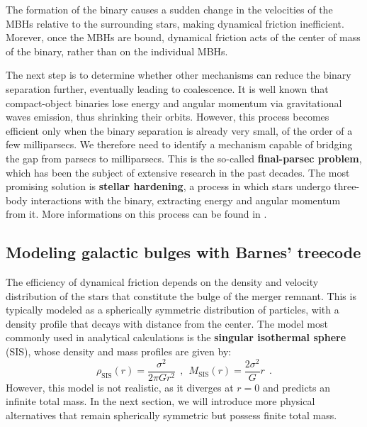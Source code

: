 \documentclass[fleqn,usenatbib]{mnras}
\begin{document}
The formation of the binary causes a sudden change in the velocities of the MBHs relative to the surrounding stars, making dynamical friction inefficient.
Morever, once the MBHs are bound, dynamical friction acts of the center of mass of the binary, rather than on the individual MBHs.

The next step is to determine whether other mechanisms can reduce the binary separation further, eventually leading to coalescence.
It is well known that compact-object binaries lose energy and angular momentum via gravitational waves emission, thus shrinking their orbits.
However, this process becomes efficient only when the binary separation is already very small, of the order of a few milliparsecs.
We therefore need to identify a mechanism capable of bridging the gap from parsecs to milliparsecs.
This is the so-called \textbf{final-parsec problem}, which has been the subject of extensive research in the past decades.
The most promising solution is \textbf{stellar hardening}, a process in which stars undergo three-body interactions with the binary, extracting energy and angular momentum from it.
More informations on this process can be found in \cite{Quinlan1996}.

\subsection{Modeling galactic bulges with Barnes' treecode}\label{sec:introduction_models}
The efficiency of dynamical friction depends on the density and velocity distribution of the stars that constitute the bulge of the merger remnant.
This is typically modeled as a spherically symmetric distribution of particles, with a density profile that decays with distance from the center.
The model most commonly used in analytical calculations is the \textbf{singular isothermal sphere} (SIS), whose density and mass profiles are given by:
\begin{equation}
    \rho_\text{SIS}(r) = \dfrac{\sigma^2}{2 \pi G r^2} \:\: , \:\: M_\text{SIS}(r) = \dfrac{2 \sigma^2}{G} r \:\:.
    \label{eq:sis_density}
\end{equation}
However, this model is not realistic, as it diverges at $r=0$ and predicts an infinite total mass.
In the next section, we will introduce more physical alternatives that remain spherically symmetric but possess finite total mass.
\end{document}
